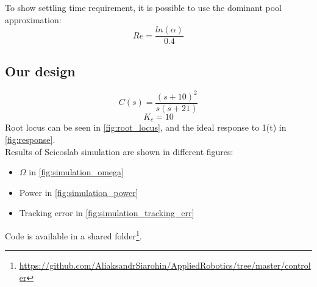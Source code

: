 \documentclass[a4paper,12pt,oneside]{article}
\begin{document}
To show settling time requirement, it is possible to use the dominant pool approximation:
\begin{equation}
Re = \frac{ln(\alpha)}{0.4}
\end{equation}

\subsection{Our design}
\begin{equation}
C(s) = \frac{(s+10)^2}{s(s+21)}
\end{equation}
\begin{equation}
K_c = 10
\end{equation}
Root locus can be seen in \cref{fig:root_locus}, and the ideal response to 1(t) in \cref{fig:response}.\\ Results of Scicoslab simulation are shown in different figures:
\begin{itemize}
\item $\Omega$ in \cref{fig:simulation_omega}
\item Power in \cref{fig:simulation_power}
\item Tracking error in \cref{fig:simulation_tracking_err}
\end{itemize}
Code is available in a shared folder\footnote{\url{https://github.com/AliaksandrSiarohin/AppliedRobotics/tree/master/controler}}.
\end{document}
